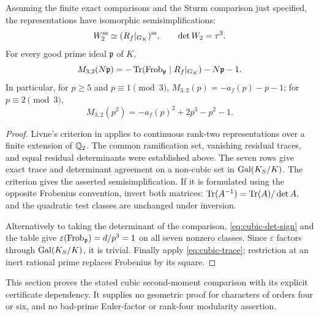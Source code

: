 \begin{theorem}
\label{thm:cubic-modular}
Assuming the finite exact comparisons and the Sturm comparison just
specified, the representations have isomorphic semisimplifications:
\[
 W_2^{\rm ss}\simeq(R_f|_{G_K})^{\rm ss},
 \qquad \det W_2=\tau^3.
\]
For every good prime ideal $\mathfrak p$ of $K$,
\[
 M_{3,2}(N\mathfrak p)
 =-\operatorname{Tr}(\operatorname{Frob}_{\mathfrak p}\mid R_f|_{G_K})-N\mathfrak p-1.
\]
In particular, for $p\ge5$ and $p\equiv1\pmod3$,
$M_{3,2}(p)=-a_f(p)-p-1$; for $p\equiv2\pmod3$,
\[
 M_{3,2}(p^2)=-a_f(p)^2+2p^3-p^2-1.
\]
\end{theorem}
\begin{proof}
Livne's criterion in \cite[Theorem 4.1]{DGP} applies to continuous
rank-two representations over a finite extension of $\mathbb Q_2$.
The common ramification set, vanishing residual traces, and equal
residual determinants were established above. The seven rows give
exact trace and determinant agreement on a non-cubic set in
$\operatorname{Gal}(K_S/K)$. The criterion gives the asserted semisimplification.
If it is formulated using the opposite Frobenius convention, invert
both matrices: $\operatorname{Tr}(A^{-1})=\operatorname{Tr}(A)/\det A$, and the quadratic test
classes are unchanged under inversion.

Alternatively to taking the determinant of the comparison,
\eqref{eq:cubic-det-sign} and the table give
$\varepsilon(\operatorname{Frob}_{\mathfrak p})=d/p^3=1$ on all seven nonzero
classes. Since $\varepsilon$ factors through $\operatorname{Gal}(K_S/K)$, it is
trivial. Finally apply \eqref{eq:cubic-trace}; restriction at an inert
rational prime replaces Frobenius by its square.
\end{proof}

This section proves the stated cubic second-moment comparison with its
explicit certificate dependency. It supplies no geometric proof for
characters of orders four or six, and no bad-prime Euler-factor or
rank-four modularity assertion.
